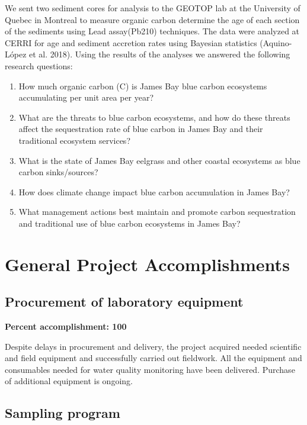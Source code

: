 \documentclass[
  12pt,
]{article}
\providecommand{\tightlist}{%
  \setlength{\itemsep}{0pt}\setlength{\parskip}{0pt}}
\begin{document}
We sent two sediment cores for analysis to the GEOTOP lab at the
University of Quebec in Montreal to measure organic carbon determine the
age of each section of the sediments using Lead assay(Pb210) techniques.
The data were analyzed at CERRI for age and sediment accretion rates
using Bayesian statistics (Aquino-López et al. 2018). Using the results
of the analyses we answered the following research questions:

\begin{enumerate}
\def\labelenumi{\arabic{enumi}.}
\tightlist
\item
  How much organic carbon (C) is James Bay blue carbon ecosystems
  accumulating per unit area per year?
\item
  What are the threats to blue carbon ecosystems, and how do these
  threats affect the sequestration rate of blue carbon in James Bay and
  their traditional ecosystem services?
\item
  What is the state of James Bay eelgrass and other coastal ecosystems
  as blue carbon sinks/sources?
\item
  How does climate change impact blue carbon accumulation in James Bay?
\item
  What management actions best maintain and promote carbon sequestration
  and traditional use of blue carbon ecosystems in James Bay?
\end{enumerate}

\hypertarget{general-project-accomplishments}{%
\section{General Project
Accomplishments}\label{general-project-accomplishments}}

\hypertarget{procurement-of-laboratory-equipment}{%
\subsection{Procurement of laboratory
equipment}\label{procurement-of-laboratory-equipment}}

\textbf{Percent accomplishment: 100}

Despite delays in procurement and delivery, the project acquired needed
scientific and field equipment and successfully carried out fieldwork.
All the equipment and consumables needed for water quality monitoring
have been delivered. Purchase of additional equipment is ongoing.

\hypertarget{sampling-program}{%
\subsection{Sampling program}\label{sampling-program}}
\end{document}
